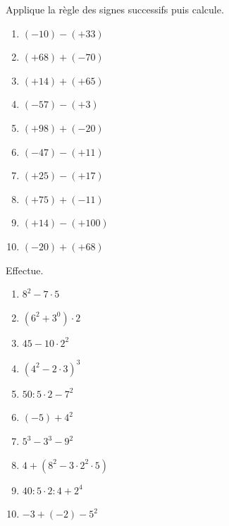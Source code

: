 \documentclass[10pt,a4paper]{article}
\begin{document}
\begin{exercise}
	Applique la règle des signes successifs puis calcule.
	\begin{enumerate}[cols=3]
		\item $(-10)-(+33)$
		\item $(+68)+(-70)$
		\item $(+14)+(+65)$
		\item $(-57)-(+3)$
		\item $(+98)+(-20)$
		\item $(-47)-(+11)$
		\item $(+25)-(+17)$
		\item $(+75)+(-11)$
		\item $(+14)-(+100)$
		\item $(-20)+(+68)$
	\end{enumerate}
\end{exercise}

\newpage
\begin{exercise}
	Effectue.
		\begin{enumerate}[cols=4]
		\item $8^2 - 7 \cdot 5$
		\item $(6^2 + 3^0)\cdot 2$
		\item $45-10\cdot2^2$
		\item $(4^2 - 2\cdot 3)^3$
		\item $50:5\cdot2 - 7^2$
		\item $(-5)+4^2$
		\item $5^3 - 3^3 - 9^2$
		\item $4+(8^2 - 3 \cdot2^2 \cdot5)$
		\item $40:5\cdot2 : 4 + 2^4$
		\item $-3 + (-2) - 5^2$
		\end{enumerate}
\end{exercise}
\end{document}
